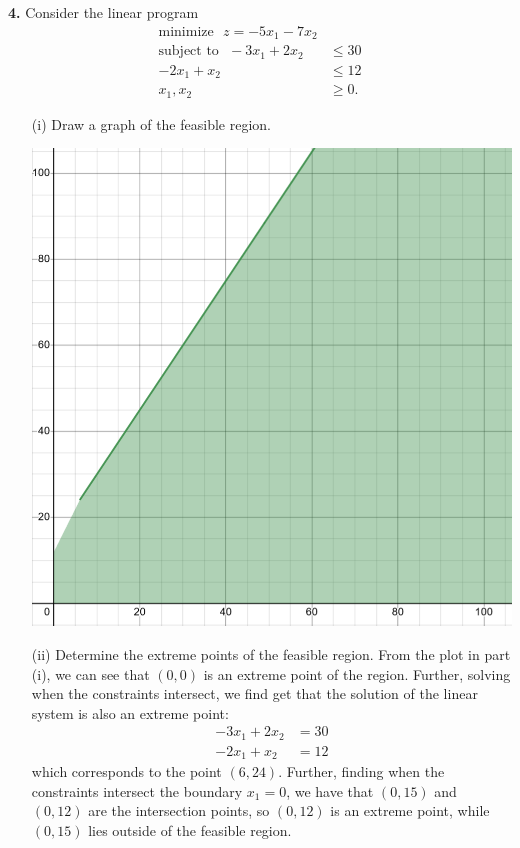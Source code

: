 \documentclass{article}
\begin{document}
\textbf{4.} Consider the linear program
\begin{align*}
    \text{minimize} \:\:\: z = -5x_1 - 7x_2\\
    \text{subject to} \:\:\: -3x_1 + 2x_2 &\leq 30\\
    -2x_1 + x_2 &\leq 12\\
    x_1,x_2 &\geq 0.
\end{align*}
\begin{itemize}
    \item[(i)] Draw a graph of the feasible region.
        \begin{center}
            \includegraphics[scale = 0.8]{region3}
        \end{center}
    \item[(ii)] Determine the extreme points of the feasible region.
    \newline\newline
    From the plot in part (i), we can see that $(0,0)$ is an extreme point of the region. Further, solving when the constraints intersect, we find get that the solution of the linear system is also an extreme point:
    \begin{align*}
        -3x_1 + 2x_2 &= 30\\
        -2x_1 + x_2 &= 12
    \end{align*}
    which corresponds to the point $(6, 24)$. Further, finding when the constraints intersect the boundary $x_1 = 0$, we have that $(0,15)$ and $(0,12)$ are the intersection points, so $(0,12)$ is an extreme point, while $(0,15)$ lies outside of the feasible region.



\end{itemize}
\end{document}
